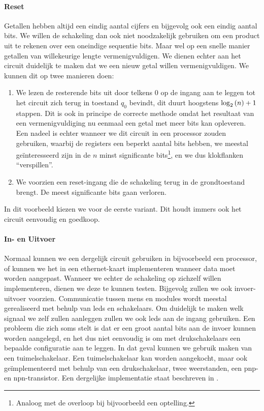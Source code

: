 \paragraph{Reset}
Getallen hebben altijd een eindig aantal cijfers en bijgevolg ook een eindig aantal bits. We willen de schakeling dan ook niet noodzakelijk gebruiken om een product uit te rekenen over een oneindige sequentie bits. Maar wel op een snelle manier getallen van willekeurige lengte vermenigvuldigen. We dienen echter aan het circuit duidelijk te maken dat we een nieuw getal willen vermenigvuldigen. We kunnen dit op twee manieren doen:
\begin{enumerate}
 \item We lezen de resterende bits uit door telkens $0$ op de ingang aan te leggen tot het circuit zich terug in toestand $q_0$ bevindt, dit duurt hoogstens $\log_2\left( n \right)+1$ stappen. Dit is ook in principe de correcte methode omdat het resultaat van een vermenigvuldiging nu eenmaal een getal met meer bits kan opleveren. Een nadeel is echter wanneer we dit circuit in een processor zouden gebruiken, waarbij de registers een beperkt aantal bits hebben, we meestal ge\"interesseerd zijn in de $n$ minst significante bits\footnote{Analoog met de overloop bij bijvoorbeeld een optelling.}, en we dus klokflanken ``verspillen''.
 \item We voorzien een reset-ingang die de schakeling terug in de grondtoestand brengt. De meest significante bits gaan verloren.
\end{enumerate}
In dit voorbeeld kiezen we voor de eerste variant. Dit houdt immers ook het circuit eenvoudig en goedkoop.
\paragraph{In- en Uitvoer}
Normaal kunnen we een dergelijk circuit gebruiken in bijvoorbeeld een processor, of kunnen we het in een ethernet-kaart implementeren wanneer data moet worden aangepast. Wanneer we echter de schakeling op zichzelf willen implementeren, dienen we deze te kunnen testen. Bijgevolg zullen we ook invoer-uitvoer voorzien. Communicatie tussen mens en modules wordt meestal gerealiseerd met behulp van leds en schakelaars. Om duidelijk te maken welk signaal we zelf zullen aanleggen zullen we ook leds aan de ingang gebruiken. Een probleem die zich soms stelt is dat er een groot aantal bits aan de invoer kunnen worden aangelegd, en het dus niet eenvoudig is om met drukschakelaars een bepaalde configuratie aan te leggen. In dat geval kunnen we gebruik maken van een tuimelschakelaar. Een tuimelschakelaar kan worden aangekocht, maar ook ge\"implementeerd met behulp van een drukschakelaar, twee weerstanden, een pnp- en npn-transistor. Een dergelijke implementatie staat beschreven in .
